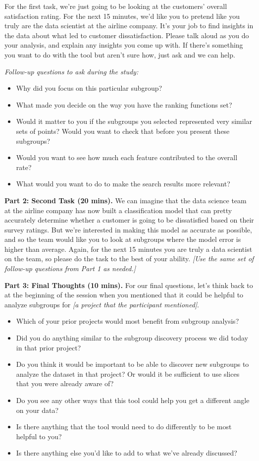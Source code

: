 For the first task, we’re just going to be looking at the customers’ overall satisfaction rating. For the next 15 minutes, we’d like you to pretend like you truly are the data scientist at the airline company. It’s your job to find insights in the data about what led to customer dissatisfaction. Please talk aloud as you do your analysis, and explain any insights you come up with. If there’s something you want to do with the tool but aren’t sure how, just ask and we can help.

\textit{Follow-up questions to ask during the study:}
\begin{itemize}
    \item Why did you focus on this particular subgroup?  
    \item What made you decide on the way you have the ranking functions set?  
    \item Would it matter to you if the subgroups you selected represented very similar sets of points? Would you want to check that before you present these subgroups?
    \item Would you want to see how much each feature contributed to the overall rate?  
    \item What would you want to do to make the search results more relevant?
\end{itemize}

\noindent \textbf{Part 2: Second Task (20 mins).}
We can imagine that the data science team at the airline company has now built a classification model that can pretty accurately determine whether a customer is going to be dissatisfied based on their survey ratings. But we’re interested in making this model as accurate as possible, and so the team would like you to look at subgroups where the model error is higher than average. Again, for the next 15 minutes you are truly a data scientist on the team, so please do the task to the best of your ability. \textit{[Use the same set of follow-up questions from Part 1 as needed.]}

\noindent \textbf{Part 3: Final Thoughts (10 mins).}
For our final questions, let’s think back to at the beginning of the session when you mentioned that it could be helpful to analyze subgroups for \textit{[a project that the participant mentioned]}.
\begin{itemize}
    \item Which of your prior projects would most benefit from subgroup analysis?  
    \item Did you do anything similar to the subgroup discovery process we did today in that prior project?
    \item Do you think it would be important to be able to discover new subgroups to analyze the dataset in that project? Or would it be sufficient to use slices that you were already aware of?  
    \item Do you see any other ways that this tool could help you get a different angle on your data?  
    \item Is there anything that the tool would need to do differently to be most helpful to you?
    \item Is there anything else you'd like to add to what we've already discussed?
\end{itemize}
